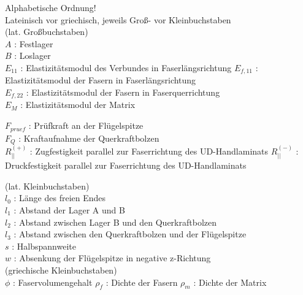 
Alphabetische Ordnung!\\ 
Lateinisch vor griechisch, jeweils Groß- vor Kleinbuchstaben\\
(lat. Großbuchstaben)\\

\noindent $ A $ : Festlager\\
$ B $ : Loslager\\
$ E_{11} $ : Elastizitätsmodul des Verbundes in Faserlängsrichtung
$ E_{f,11} $ : Elastizitätsmodul der Fasern in Faserlängsrichtung\\
$ E_{f,22} $ : Elastizitätsmodul der Fasern in Faserquerrichtung\\
$ E_{M} $ : Elastizitätsmodul der Matrix

$ F_{pruef} $ : Prüfkraft an der Flügelspitze\\
$ F_{Q} $ : Kraftaufnahme der Querkraftbolzen \\
$ R^{(+)}_{||} $ : Zugfestigkeit parallel zur Faserrichtung des UD-Handlaminats
$ R^{(-)}_{||} $ : Druckfestigkeit parallel zur Faserrichtung des UD-Handlaminats



\noindent (lat. Kleinbuchstaben)\\

\noindent $l_{0}$ : Länge des freien Endes\\
$l_{1}$ : Abstand der Lager A und B\\
$l_{2}$ : Abstand zwischen Lager B und den Querkraftbolzen\\
\noindent $l_{3}$ : Abstand zwischen den Querkraftbolzen und der Flügelspitze\\
$ s $ : Halbspannweite\\
$ w $ : Absenkung der Flügelspitze in negative z-Richtung\\

(griechische Kleinbuchstaben)\\
\noindent 
$ \phi  $ : Faservolumengehalt
$ \rho_{f} $ : Dichte der Fasern
$ \rho_{m} $ : Dichte der Matrix


